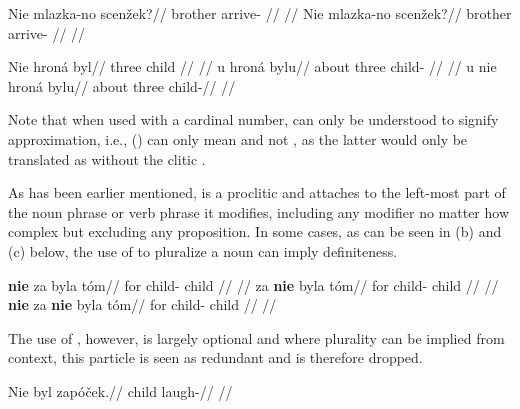 \pex
\begingl
    \gla Nie mlazka-no scenžek?//
    \glb {} brother arrive- //
    \glft {}//
\endgl
\xe
\pex
\begingl
    \gla Nie mlazka-no scenžek?//
    \glb {} brother arrive- //
    \glft {}//
\endgl
\xe

\pex
\a
\begingl{}
    \gla Nie hroná byl//
    \glb {} three child //
    \glft {}//
\endgl
\a
\begingl
    \gla u hroná bylu//
    \glb about three child- //
    \glft {}//
\endgl
\a
\begingl
    \gla u nie hroná bylu//
    \glb about  three child-//
    \glft {}//
\endgl
\xe

Note that when used with a cardinal number,  can only be understood to signify approximation, i.e., () can only mean  and not , as the latter would only be translated as  without the clitic .

As has been earlier mentioned,  is a proclitic and attaches to the left-most part of the noun phrase or verb phrase it modifies, including any modifier no matter how complex but excluding any proposition. In some cases, as can be seen in (b) and (c) below, the use of  to pluralize a noun can imply definiteness.

\pex
\a
\begingl{}
    \gla \textbf{nie} za byla tóm//
    \glb {} for child- child //
    \glft {}//
\endgl
\a
\begingl{}
    \gla za \textbf{nie} byla tóm//
    \glb for  child- child //
    \glft {}//
\endgl
\a
\begingl{}
    \gla \textbf{nie} za \textbf{nie} byla tóm//
    \glb {} for  child- child //
    \glft {}//
\endgl
\xe





The use of , however, is largely optional and where plurality can be implied from context, this particle is seen as redundant and is therefore dropped.

\pex
\begingl
\gla Nie byl zapóček.//
\glb {} child laugh-//
\glft {}//
\endgl
\xe

